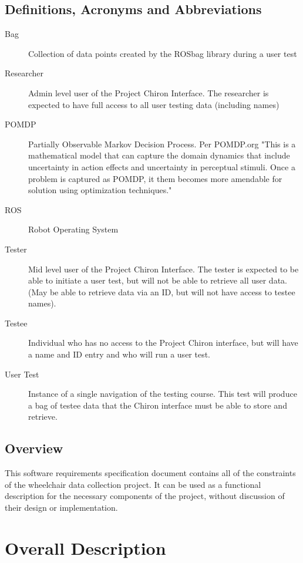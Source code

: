 \documentclass[onecolumn, draftclsnofoot,10pt, compsoc]{IEEEtran}
\begin{document}
\subsection{Definitions, Acronyms and Abbreviations}
\begin{description}
\item [Bag] \hfill \break Collection of data points created by the ROSbag library during a user test
\item [Researcher] \hfill \break Admin level user of the Project Chiron Interface. The researcher is expected to have full access to all user testing data (including names)
\item [POMDP] \hfill \break Partially Observable Markov Decision Process. Per POMDP.org "This is a mathematical model that can capture the domain dynamics that include uncertainty in action effects and uncertainty in perceptual stimuli. Once a problem is captured as POMDP, it them becomes more amendable for solution using optimization techniques." \cite{1}
\item [ROS] \hfill \break Robot Operating System
\item [Tester] Mid level user of the Project Chiron Interface. The tester is expected to be able to initiate a user test, but will not be able to retrieve all user data. (May be able to retrieve data via an ID, but will not have access to testee names).
\item [Testee] \hfill \break Individual who has no access to the Project Chiron interface, but will have a name and ID entry and who will run a user test.
\item [User Test] \hfill \break Instance of a single navigation of the testing course. This test will produce a bag of testee data that the Chiron interface must be able to store and retrieve.
\end{description}

\subsection{Overview}
This software requirements specification document contains all of the constraints of the wheelchair data collection project. It can be used as a functional description for the necessary components of the project, without discussion of their design or implementation.


\section{Overall Description}
\end{document}

